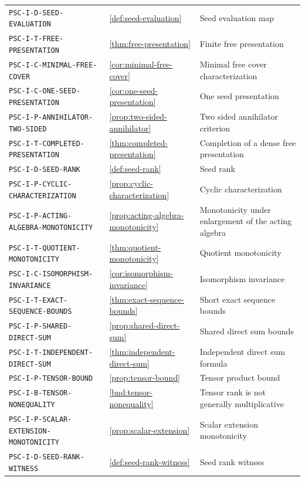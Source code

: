 \begin{longtable}{@{}p{}p{}p{}@{}}
\nolinkurl{PSC-I-D-SEED-EVALUATION} & \ref{def:seed-evaluation} & Seed evaluation map \\
\nolinkurl{PSC-I-T-FREE-PRESENTATION} & \ref{thm:free-presentation} & Finite free presentation \\
\nolinkurl{PSC-I-C-MINIMAL-FREE-COVER} & \ref{cor:minimal-free-cover} & Minimal free cover characterization \\
\nolinkurl{PSC-I-C-ONE-SEED-PRESENTATION} & \ref{cor:one-seed-presentation} & One seed presentation \\
\nolinkurl{PSC-I-P-ANNIHILATOR-TWO-SIDED} & \ref{prop:two-sided-annihilator} & Two sided annihilator criterion \\
\nolinkurl{PSC-I-T-COMPLETED-PRESENTATION} & \ref{thm:completed-presentation} & Completion of a dense free presentation \\
\nolinkurl{PSC-I-D-SEED-RANK} & \ref{def:seed-rank} & Seed rank \\
\nolinkurl{PSC-I-P-CYCLIC-CHARACTERIZATION} & \ref{prop:cyclic-characterization} & Cyclic characterization \\
\nolinkurl{PSC-I-P-ACTING-ALGEBRA-MONOTONICITY} & \ref{prop:acting-algebra-monotonicity} & Monotonicity under enlargement of the acting algebra \\
\nolinkurl{PSC-I-T-QUOTIENT-MONOTONICITY} & \ref{thm:quotient-monotonicity} & Quotient monotonicity \\
\nolinkurl{PSC-I-C-ISOMORPHISM-INVARIANCE} & \ref{cor:isomorphism-invariance} & Isomorphism invariance \\
\nolinkurl{PSC-I-T-EXACT-SEQUENCE-BOUNDS} & \ref{thm:exact-sequence-bounds} & Short exact sequence bounds \\
\nolinkurl{PSC-I-P-SHARED-DIRECT-SUM} & \ref{prop:shared-direct-sum} & Shared direct sum bounds \\
\nolinkurl{PSC-I-T-INDEPENDENT-DIRECT-SUM} & \ref{thm:independent-direct-sum} & Independent direct sum formula \\
\nolinkurl{PSC-I-P-TENSOR-BOUND} & \ref{prop:tensor-bound} & Tensor product bound \\
\nolinkurl{PSC-I-B-TENSOR-NONEQUALITY} & \ref{bnd:tensor-nonequality} & Tensor rank is not generally multiplicative \\
\nolinkurl{PSC-I-P-SCALAR-EXTENSION-MONOTONICITY} & \ref{prop:scalar-extension} & Scalar extension monotonicity \\
\nolinkurl{PSC-I-D-SEED-RANK-WITNESS} & \ref{def:seed-rank-witness} & Seed rank witness \\

\end{longtable}
